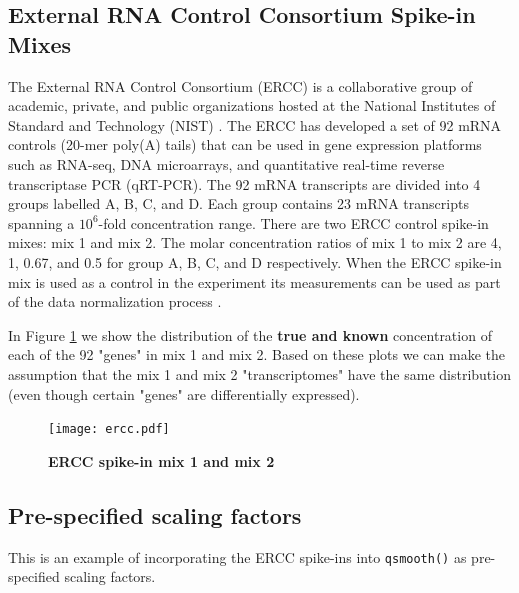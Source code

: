 \documentclass{article}\usepackage[]{graphicx}\usepackage[usenames,dvipsnames]{color}
\begin{document}
\subsection{External RNA Control Consortium Spike-in Mixes}

The External RNA Control Consortium (ERCC)
is a collaborative group of academic, private, and 
public organizations hosted at the 
National Institutes of Standard and Technology (NIST)
\cite{baker2005external, external2005proposed}. 
The ERCC has developed a set of 92 mRNA controls 
(20-mer poly(A) tails) that can be used in gene expression 
platforms such as RNA-seq, DNA microarrays, and 
quantitative real-time reverse transcriptase PCR (qRT-PCR).
The 92 mRNA transcripts are divided into 4 groups labelled
A, B, C, and D.  
Each group contains 23 mRNA transcripts 
spanning a $10^6$-fold concentration range.
There are two ERCC control spike-in mixes: mix 1 and mix 2. 
The molar concentration ratios of mix 1 to mix 2 are 4, 1, 0.67, and 
0.5 for group A, B, C, and D respectively. 
When the ERCC spike-in mix is used as a 
control in the experiment its measurements can be used 
as part of the data normalization process
\cite{loven2012revisiting, risso2014normalization}.

In Figure \ref{ercc} we show the distribution of the 
{\bf true and known} concentration of each of the 92 "genes" in 
mix 1 and mix 2. Based on these plots we can make the 
assumption that the mix 1 and mix 2 "transcriptomes" have
the same distribution 
(even though certain "genes" are differentially expressed).

\begin{figure}[!h]
\begin{center}
\texttt{[image: ercc.pdf]}
\end{center}
\small\normalsize
\caption[qsmooth algorithm]
         {{\bf ERCC spike-in mix 1 and mix 2}}
\label{ercc}
\end{figure}

\subsection{Pre-specified scaling factors}
This is an example of incorporating the ERCC spike-ins into \texttt{qsmooth()}
as pre-specified scaling factors. 
\end{document}
